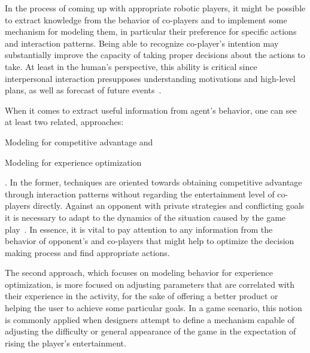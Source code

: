 In the process of coming up with appropriate robotic players, it might be possible to extract knowledge from the behavior of co-players and to implement some mechanism for modeling them, in particular their preference for specific actions and interaction patterns. %
Being able to recognize co-player's intention may substantially improve the capacity of taking proper decisions about the actions to take. At least in the human's perspective, this ability is critical since interpersonal interaction presupposes understanding motivations and high-level plans, as well as forecast of future events~\citep{sukthankar_plan_2014}.

When it comes to extract useful information from agent's behavior, one can see at least two related, approaches: \begin{inparaenum}\item Modeling for competitive advantage and \item Modeling for experience optimization\end{inparaenum}. In the former, techniques are oriented towards obtaining competitive advantage through interaction patterns without regarding the entertainment level of co-players directly. 
Against an opponent with private strategies and conflicting goals it is necessary to adapt to the dynamics of the situation caused by the game play~\citep{rofer_overview_2012}. In essence, it is vital to pay attention to any information from the behavior of opponent's and co-players that might help to optimize the decision making process and find appropriate actions.

The second approach, which focuses on modeling behavior for experience optimization, is more focused on adjusting parameters that are correlated with their experience in the activity, for the sake of offering a better product or helping the user to achieve some particular goals. In a game scenario, this notion is commonly applied when designers attempt to define a mechanism capable of adjusting the difficulty or general appearance of the game in the expectation of rising the player's entertainment.

